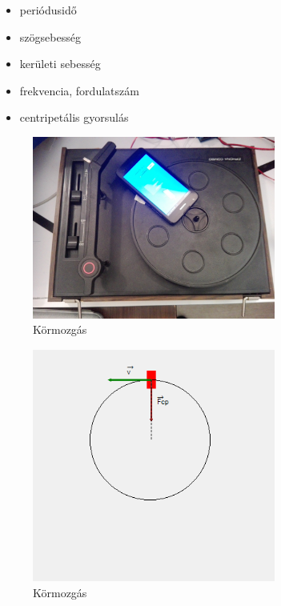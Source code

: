 \documentclass{thesis-ekf}
\theoremstyle{definition}
\theoremstyle{remark}
\begin{document}
\begin{itemize}
	\item periódusidő 
	\item szögsebesség
	\item kerületi sebesség
	\item frekvencia, fordulatszám
	\item centripetális gyorsulás
\end{itemize}
	\begin{figure}[!h]
		\centering
		\includegraphics[width=8cm]{kormozgas}
		\caption{Körmozgás}\label{kor}
	\end{figure}
	\begin{figure}[!h]
		\centering
		\includegraphics[width=8cm]{korkep}
		\caption{Körmozgás}\label{kokep}
	\end{figure}
\pagebreak	
\end{document}
